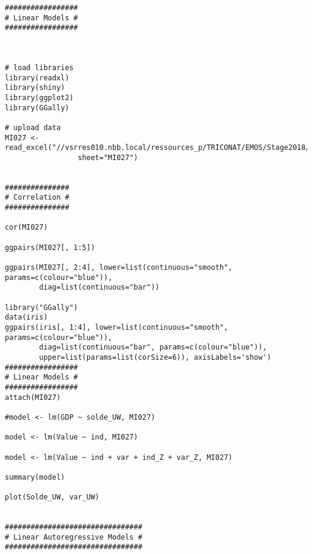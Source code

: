 \begin{lstlisting}
#################
# Linear Models #
#################



# load libraries
library(readxl)
library(shiny)
library(ggplot2)
library(GGally)

# upload data
MI027 <- read_excel("//vsrres010.nbb.local/ressources_p/TRICONAT/EMOS/Stage2018/Datasets/RS_975.xlsx",
                 sheet="MI027")


###############
# Correlation #
###############

cor(MI027)

ggpairs(MI027[, 1:5])

ggpairs(MI027[, 2:4], lower=list(continuous="smooth", params=c(colour="blue")),
        diag=list(continuous="bar"))

library("GGally")
data(iris)
ggpairs(iris[, 1:4], lower=list(continuous="smooth", params=c(colour="blue")),
        diag=list(continuous="bar", params=c(colour="blue")), 
        upper=list(params=list(corSize=6)), axisLabels='show')
#################
# Linear Models #
#################
attach(MI027)

#model <- lm(GDP ~ solde_UW, MI027)

model <- lm(Value ~ ind, MI027)

model <- lm(Value ~ ind + var + ind_Z + var_Z, MI027)

summary(model)

plot(Solde_UW, var_UW)


################################
# Linear Autoregressive Models #
################################


\end{lstlisting}